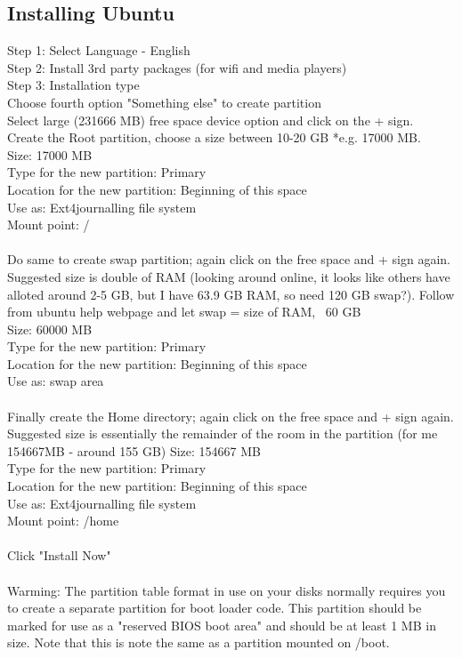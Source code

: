 \documentclass[]{article}
\begin{document}
\subsection{Installing Ubuntu}
Step 1: Select Language - English\\
Step 2: Install 3rd party packages (for wifi and media players)\\
Step 3: Installation type\\
Choose fourth option "Something else" to create partition\\
Select large (231666 MB) free space device option and click on the + sign.\\
Create the Root partition, choose a size between 10-20 GB *e.g. 17000 MB.\\
Size: 17000 MB\\
Type for the new partition: Primary\\
Location for the new partition: Beginning of this space\\
Use as: Ext4journalling file system\\
Mount point: / \\
\\
Do same to create swap partition; again click on the free space and + sign again. Suggested size is double of RAM (looking around online, it looks like others have alloted around 2-5 GB, but I have 63.9 GB RAM, so need 120 GB swap?). Follow from ubuntu help webpage and let swap = size of RAM, ~60 GB\\
Size: 60000 MB\\
Type for the new partition: Primary\\
Location for the new partition: Beginning of this space\\
Use as: swap area\\
\\
Finally create the Home directory; again click on the free space and + sign again. Suggested size is essentially the remainder of the room in the partition (for me 154667MB - around 155 GB)
Size: 154667 MB\\
Type for the new partition: Primary\\
Location for the new partition: Beginning of this space\\
Use as: Ext4journalling file system\\
Mount point: /home\\
\\
Click "Install Now"\\
\\
Warming: The partition table format in use on your disks normally requires you to create a separate partition for boot loader code. This partition should be marked for use as a "reserved BIOS boot area" and should be at least 1 MB in size. Note that this is note the same as a partition mounted on /boot.
\end{document}
